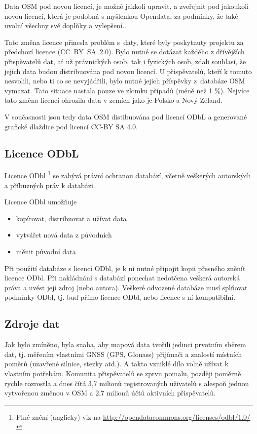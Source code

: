 Data OSM pod novou licencí, je možné jakkoli upravit,
a zveřejnit pod jakoukoli novou licencí,
která je podobná s myšlenkou Opendata, 
za podmínky, že také uvolní všechny své doplňky a vylepšení.\cite{OSMlicenceChange}.

Tato změna licence přinesla problém
s~daty, které byly poskytnuty projektu za předchozí licence
(CC~BY~SA~2.0). Bylo nutné se dotázat každého z dřívějších
přispěvatelů dat, ať už právnických osob, tak i fyzických osob,
zdali souhlasí, že jejich data budou distribuována pod novou licencí.
U přispěvatelů, kteří k tomuto nesvolili, nebo ti co se nevyjádřili,
bylo nutné jejich příspěvky z~databáze OSM vymazat.
Tato situace nastala pouze ve zlomku případů (méně než 1 \%).
Nejvíce tato změna licencí ohrozila data v zemích jako je Polsko a Nový Zéland. \cite {OSMlicenceIssue}

V současnosti jsou tedy data OSM distibuována pod licencí ODbL a
generované grafické dlaždice pod licencí CC-BY SA 4.0. \cite{OSMlicence}

\subsection{Licence ODbL}
Licence ODbl \footnote{Plné znění (anglicky) viz na \url{http://opendatacommons.org/licenses/odbl/1.0/}}
se zabývá právní ochranou databází, včetně
veškerých autorských a příbuzných práv k databázi.

Licence ODbl umožňuje
\begin{itemize}
    \item    kopírovat, distribuovat a užívat data
    \item    vytvářet nová data z původních
    \item    měnit původní data
\end{itemize}

Při použití databáze s licencí ODbl, je k ni
nutné připojit kopii přesného zněnít licence ODbl.
Při nakládnání s databází ponechat nedotčena veškerá autorská práva a
uvést její zdroj (nebo autora).
Veškeré odvozené databáze musí splňovat podmínky ODbl,
tj. buď přímo licence ODbl, nebo licence s ní kompatibilní.
\cite{Nesetril2013thesis}

\subsection{Zdroje dat}
\label{Zdroje dat}
Jak bylo zmíněno, byla snaha, aby mapová data tvořili jedinci prvotním
sběrem dat, tj. měřením vlastními GNSS (GPS, Glonass) přijímači a
znalostí místních poměrů (uzavřené silnice, stezky atd.).  A takto
vzniklé dílo volně užívat k vlastním potřebám. Komunita přispěvatelů se
zprvu pomalu, později poměrně rychle rozrostla a dnes čítá 3,7 milionů
registrovaných uživatelů s alespoň jednou vytvořenou změnou v OSM a
2,7 milionů účtů aktivních přispěvatelů.\cite{OSMstats}

